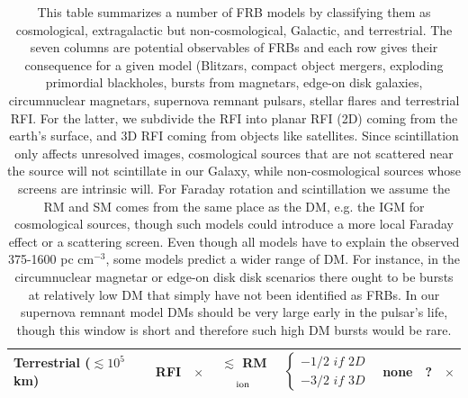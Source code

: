 \documentclass[graphics]{beamer}
\begin{document}
{{\begin{table}
\begin{tabularx}{1.08\textwidth}{@{\extracolsep{\fill}}|lccccccc|}
\multicolumn{1}{|l|}{Terrestrial ($\lesssim 10^5$ km)}                                                                             & RFI                                                         & $\times$                                                                         & $\lesssim$ RM$_{\rm ion}$                                                          & $\left\{\begin{matrix}-1/2 \,\, if \,\, 2D \\ -3/2 \,\, if \,\, 3D\end{matrix}\right.$ & none                                                                        & ?                                                                       & $\times$                                                                  \\ \hline

\end{tabularx}
\caption{This table summarizes a number of FRB models by classifying them as cosmological, 
extragalactic but non-cosmological, Galactic, and terrestrial. 
The seven columns are potential observables of FRBs and each
 row gives their consequence for a given model 
 (Blitzars,
 compact object mergers,
 exploding primordial blackholes,
bursts from magnetars,
edge-on disk galaxies,
circumnuclear magnetars,
 supernova remnant pulsars, stellar flares
and terrestrial RFI.
For the latter, we subdivide the RFI into planar RFI (2D) coming
 from the earth's surface, and 3D RFI coming from objects like satellites. 
 Since scintillation
only affects unresolved images, cosmological sources that are not scattered near the source
will not scintillate in our Galaxy, while non-cosmological sources whose screens are intrinsic will. 
For Faraday rotation and scintillation
 we assume 
the RM and SM comes from the same place as the DM, e.g. the IGM for cosmological sources, though such models 
could introduce a more local Faraday effect or a scattering screen.
Even though
all models have to explain the observed 375-1600 pc cm$^{-3}$, some models predict a wider 
range of DM. For instance, in the circumnuclear magnetar or edge-on disk disk scenarios there 
ought to be bursts at relatively low DM that simply have not been identified as FRBs. In our supernova 
remnant model DMs should be very large early in the pulsar's life, though this window is short and 
therefore such high DM bursts would be rare.}
\end{table}

}
  }
\end{document}
